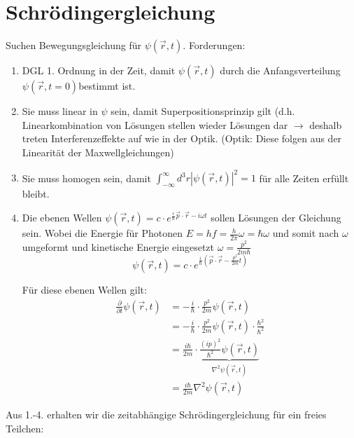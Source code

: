 



\section*{Schrödingergleichung}


Suchen Bewegungsgleichung für $\psi(\vec{r},t)$. Forderungen:
\begin{enumerate}
\item DGL 1. Ordnung in der Zeit, damit $\psi(\vec{r},t)$ durch die Anfangsverteilung
  $\psi(\vec{r},t=0)$bestimmt ist.
\item Sie muss linear in $\psi$ sein, damit Superpositionsprinzip gilt (d.h.
  Linearkombination von Lösungen stellen wieder Lösungen dar $\rightarrow$ deshalb
  treten Interferenzeffekte auf wie in der Optik. (Optik: Diese folgen
  aus der Linearität der Maxwellgleichungen)
\item Sie muss homogen sein, damit
  $\int_{-\infty}^{\infty}d^{3}r|\psi(\vec{r},t)|^{2}=1$ für
  alle Zeiten erfüllt bleibt.
\item Die ebenen Wellen \(\psi(\vec{r},t)=c\cdot  e^{\frac{i}{\hbar}\vec{p}\cdot\vec{r}-i\omega t}\) sollen  Lösungen der Gleichung sein. Wobei die Energie für Photonen \(E=hf=\frac{h}{2\pi}\omega=\hbar\omega\) und somit nach \(\omega\) umgeformt und kinetische Energie eingesetzt \(\omega = \frac{p^2}{2m\hbar}\)  \\

  \begin{equation}
    \label{eq:1}
    \psi(\vec{r},t)=c\cdot  e^{\frac{i}{\hbar}(\vec{p}\cdot\vec{r}-\frac{p^{2}}{2m}t)}
  \end{equation}

  Für diese ebenen Wellen gilt:
  \begin{align*}
    \frac{\partial}{\partial t}\psi(\vec{r},t) &=
      -\frac{i}{\hbar}\cdot\frac{p^{2}}{2m}\psi(\vec{r},t)\\
      &=-\frac{i}{\hbar}\cdot\frac{p^{2}}{2m}\psi(\vec{r},t)
      \cdot \frac{\hbar^2}{\hbar^2}\\
  &= \frac{i\hbar}{2m}\cdot  \underbrace{\frac{(ip)^2}{\hbar^2}\psi(\vec{r},t)}_{\nabla^2\psi(\vec{r},t)}\\
  &= \frac{i\hbar}{2m}\nabla^2\psi(\vec{r},t)
\end{align*}
\end{enumerate}

Aus 1.-4. erhalten wir die zeitabhängige Schrödingergleichung für ein
freies Teilchen:

